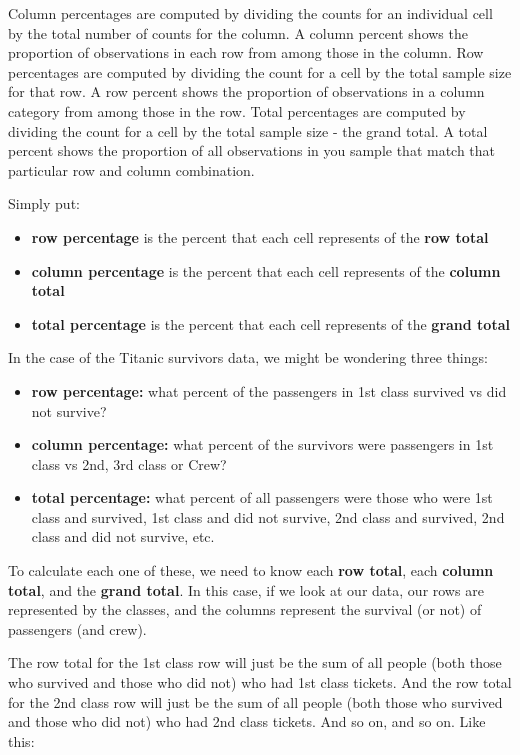 \documentclass[
]{book}
\providecommand{\tightlist}{%
  \setlength{\itemsep}{0pt}\setlength{\parskip}{0pt}}
\begin{document}
Column percentages are computed by dividing the counts for an individual cell by the total number of counts for the column. A column percent shows the proportion of observations in each row from among those in the column. Row percentages are computed by dividing the count for a cell by the total sample size for that row. A row percent shows the proportion of observations in a column category from among those in the row. Total percentages are computed by dividing the count for a cell by the total sample size - the grand total. A total percent shows the proportion of all observations in you sample that match that particular row and column combination.

Simply put:

\begin{itemize}
\tightlist
\item
  \textbf{row percentage} is the percent that each cell represents of the \textbf{row total}
\item
  \textbf{column percentage} is the percent that each cell represents of the \textbf{column total}
\item
  \textbf{total percentage} is the percent that each cell represents of the \textbf{grand total}
\end{itemize}

In the case of the Titanic survivors data, we might be wondering three things:

\begin{itemize}
\tightlist
\item
  \textbf{row percentage:} what percent of the passengers in 1st class survived vs did not survive?
\item
  \textbf{column percentage:} what percent of the survivors were passengers in 1st class vs 2nd, 3rd class or Crew?
\item
  \textbf{total percentage:} what percent of all passengers were those who were 1st class and survived, 1st class and did not survive, 2nd class and survived, 2nd class and did not survive, etc.
\end{itemize}

To calculate each one of these, we need to know each \textbf{row total}, each \textbf{column total}, and the \textbf{grand total}. In this case, if we look at our data, our rows are represented by the classes, and the columns represent the survival (or not) of passengers (and crew).

The row total for the 1st class row will just be the sum of all people (both those who survived and those who did not) who had 1st class tickets. And the row total for the 2nd class row will just be the sum of all people (both those who survived and those who did not) who had 2nd class tickets. And so on, and so on. Like this:
\end{document}
